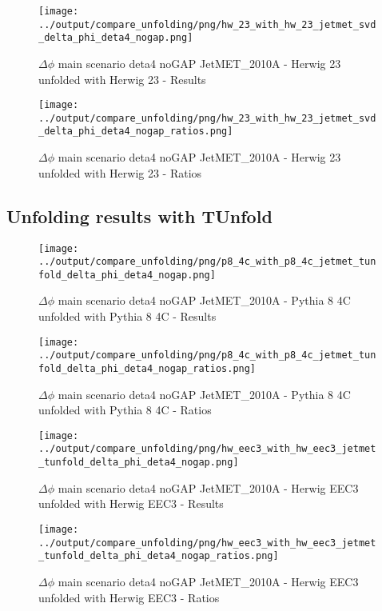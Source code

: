 \documentclass[11pt]{book}
\begin{document}
\begin{figure}[ht]
\centering
\texttt{[image: ../output/compare\_unfolding/png/hw\_23\_with\_hw\_23\_jetmet\_svd\_delta\_phi\_deta4\_nogap.png]}
\caption{$\Delta\phi$ main scenario deta4 noGAP JetMET\_2010A - Herwig 23 unfolded with Herwig 23 - Results}
\label{hw_23_hw_23_jetmet_svd_delta_phi_deta4_nogap_a}
\end{figure}

\begin{figure}[ht]
\centering
\texttt{[image: ../output/compare\_unfolding/png/hw\_23\_with\_hw\_23\_jetmet\_svd\_delta\_phi\_deta4\_nogap\_ratios.png]}
\caption{$\Delta\phi$ main scenario deta4 noGAP JetMET\_2010A - Herwig 23 unfolded with Herwig 23 - Ratios}
\label{hw_23_hw_23_jetmet_svd_delta_phi_deta4_nogap_b}
\end{figure}


\clearpage
\subsection{Unfolding results with TUnfold}

\begin{figure}[ht]
\centering
\texttt{[image: ../output/compare\_unfolding/png/p8\_4c\_with\_p8\_4c\_jetmet\_tunfold\_delta\_phi\_deta4\_nogap.png]}
\caption{$\Delta\phi$ main scenario deta4 noGAP JetMET\_2010A - Pythia 8 4C unfolded with Pythia 8 4C - Results}
\label{p8_p8_jetmet_tunfold_delta_phi_deta4_nogap_a}
\end{figure}

\begin{figure}[ht]
\centering
\texttt{[image: ../output/compare\_unfolding/png/p8\_4c\_with\_p8\_4c\_jetmet\_tunfold\_delta\_phi\_deta4\_nogap\_ratios.png]}
\caption{$\Delta\phi$ main scenario deta4 noGAP JetMET\_2010A - Pythia 8 4C unfolded with Pythia 8 4C - Ratios}
\label{p8_p8_jetmet_tunfold_delta_phi_deta4_nogap_b}
\end{figure}

\begin{figure}[ht]
\centering
\texttt{[image: ../output/compare\_unfolding/png/hw\_eec3\_with\_hw\_eec3\_jetmet\_tunfold\_delta\_phi\_deta4\_nogap.png]}
\caption{$\Delta\phi$ main scenario deta4 noGAP JetMET\_2010A - Herwig EEC3 unfolded with Herwig EEC3 - Results}
\label{hw_eec3_hw_eec3_jetmet_tunfold_delta_phi_deta4_nogap_a}
\end{figure}

\begin{figure}[ht]
\centering
\texttt{[image: ../output/compare\_unfolding/png/hw\_eec3\_with\_hw\_eec3\_jetmet\_tunfold\_delta\_phi\_deta4\_nogap\_ratios.png]}
\caption{$\Delta\phi$ main scenario deta4 noGAP JetMET\_2010A - Herwig EEC3 unfolded with Herwig EEC3 - Ratios}
\label{hw_eec3_hw_eec3_jetmet_tunfold_delta_phi_deta4_nogap_b}
\end{figure}
\end{document}
